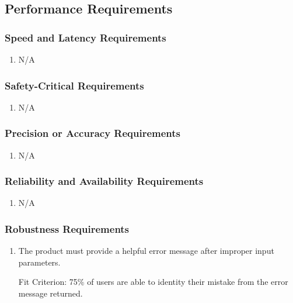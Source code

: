 \documentclass[12pt, titlepage]{article}
\begin{document}
\color{black}

\subsection{Performance Requirements}

\color{red}

\subsubsection{Speed and Latency Requirements}

\begin{enumerate}[label=SLR\arabic*:, wide=0pt, leftmargin=*]
    \item N/A
\end{enumerate}

\subsubsection{Safety-Critical Requirements}

\begin{enumerate}[label=SCR\arabic*:, wide=0pt, leftmargin=*]
    \item N/A
\end{enumerate}


\subsubsection{Precision or Accuracy Requirements}

\begin{enumerate}[label=PAR\arabic*:, wide=0pt, leftmargin=*]
    \item N/A
\end{enumerate}


\subsubsection{Reliability and Availability Requirements}

\begin{enumerate}[label=RAR\arabic*:, wide=0pt, leftmargin=*]
    \item N/A
\end{enumerate}

\color{black}

\subsubsection{Robustness Requirements}
\begin{enumerate}[label=RR\arabic*:, wide=0pt, leftmargin=*]
    \item The product must provide a helpful error message after improper input parameters.
    \item [Fit Criterion:] 75\% of users are able to identity their mistake from the error message returned.
\end{enumerate}
\end{document}
